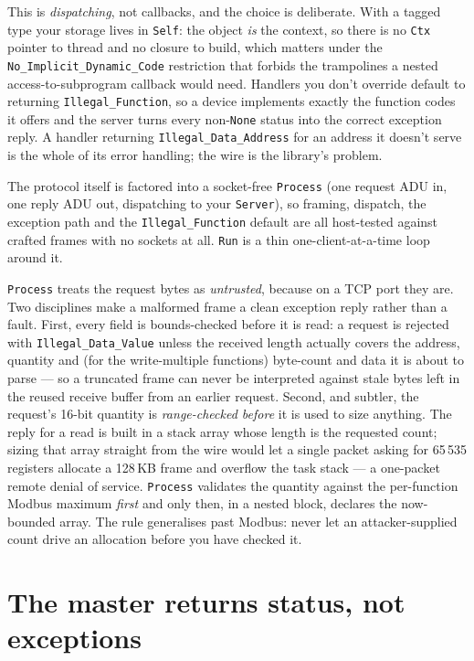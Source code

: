 This is \emph{dispatching}, not callbacks, and the choice is deliberate. With a tagged
type your storage lives in \texttt{Self}: the object \emph{is} the context, so there
is no \texttt{Ctx} pointer to thread and no closure to build, which matters under the
\texttt{No\_Implicit\_Dynamic\_Code} restriction that forbids the trampolines a nested
access-to-subprogram callback would need. Handlers you don't override default to
returning \texttt{Illegal\_Function}, so a device implements exactly the function codes
it offers and the server turns every non-\texttt{None} status into the correct
exception reply. A handler returning \texttt{Illegal\_Data\_Address} for an address it
doesn't serve is the whole of its error handling; the wire is the library's problem.

The protocol itself is factored into a socket-free \texttt{Process} (one request ADU in,
one reply ADU out, dispatching to your \texttt{Server}), so framing, dispatch, the
exception path and the \texttt{Illegal\_Function} default are all host-tested against
crafted frames with no sockets at all. \texttt{Run} is a thin one-client-at-a-time loop
around it.

\texttt{Process} treats the request bytes as \emph{untrusted}, because on a TCP port
they are. Two disciplines make a malformed frame a clean exception reply rather than
a fault. First, every field is bounds-checked before it is read: a request is
rejected with \texttt{Illegal\_Data\_Value} unless the received length actually
covers the address, quantity and (for the write-multiple functions) byte-count and
data it is about to parse --- so a truncated frame can never be interpreted against
stale bytes left in the reused receive buffer from an earlier request. Second, and
subtler, the request's 16-bit quantity is \emph{range-checked before} it is used to
size anything. The reply for a read is built in a stack array whose length is the
requested count; sizing that array straight from the wire would let a single packet
asking for 65\,535 registers allocate a 128\,KB frame and overflow the task
stack --- a one-packet remote denial of service. \texttt{Process} validates the
quantity against the per-function Modbus maximum \emph{first} and only then, in a
nested block, declares the now-bounded array. The rule generalises past Modbus: never
let an attacker-supplied count drive an allocation before you have checked it.

\section{The master returns status, not exceptions}


